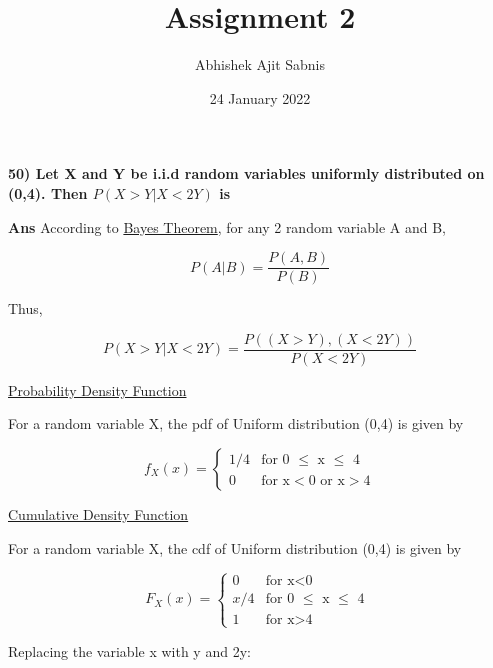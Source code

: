 \documentclass{article}
\title{\textbf{Assignment 2}}
\author{Abhishek Ajit Sabnis}
\date{24 January 2022}
\begin{document}
\maketitle

\textbf{50) Let X and Y be i.i.d random variables uniformly distributed on (0,4). Then $P(X>Y|X<2Y)$ is}

\vspace{0.5cm}

\textbf{Ans} According to \underline{Bayes Theorem}, for any 2 random variable A and B, 

\begin{equation}
    P(A|B) = \frac{P(A,B)}{P(B)}
\end{equation}

Thus, 

\begin{equation}
    P(X>Y|X<2Y) = \frac{P ((X>Y), (X<2Y)) }{P(X<2Y)}
\end{equation}

\vspace{0.2cm}

\underline{Probability Density Function}

\vspace{0.1cm}

For a random variable X, the pdf of Uniform distribution (0,4) is given by

\begin{equation}
  f_X(x) =
    \begin{cases}
      1/4 & \text{for 0 $\leq$ x $\leq$ 4 }\\
      0 & \text{for x$<$0 or x$>$4}
    \end{cases}       
\end{equation}

\underline{Cumulative Density Function}

\vspace{0.1cm}

For a random variable X, the cdf of Uniform distribution (0,4) is given by

\begin{equation}
  F_X(x) =
    \begin{cases}
      0 & \text{for x$<$0}\\
      x/4 & \text{for 0 $\leq$ x $\leq$ 4 }\\
      1 & \text{for x$>$4}
    \end{cases}       
\end{equation}

Replacing the variable x with y and 2y:
\end{document}
